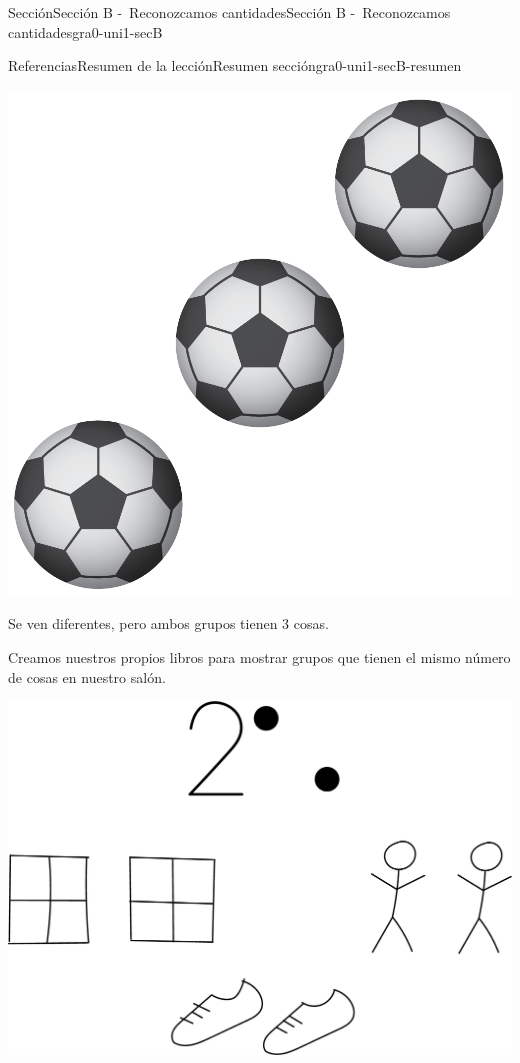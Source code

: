 \documentclass[twoside,10pt,]{article}
\begin{document}
\begin{sectionptx}{Sección}{Sección B -~Reconozcamos cantidades}{}{Sección B -~Reconozcamos cantidades}{}{}{gra0-uni1-secB}
\begin{references-subsection}{Referencias}{Resumen de la lección}{}{Resumen sección}{}{}{gra0-uni1-secB-resumen}
\begin{sidebyside}{2}{0.1}{0.1}{0.2}
\begin{sbspanel}{0.3}
\includegraphics[width=\linewidth]{external/png-source/K.1.C11.BLM.H.png}
\end{sbspanel}%
\end{sidebyside}%
\par
Se ven diferentes, pero ambos grupos tienen 3 cosas.%
\par
Creamos nuestros propios libros para mostrar grupos que tienen el mismo número  de cosas en nuestro salón.%
\begin{image}{0.2}{0.6}{0.2}{}%
\includegraphics[width=\linewidth]{external/png-source/BLM picture books-2.png}
\end{image}%
\end{references-subsection}
\end{sectionptx}
\end{document}
